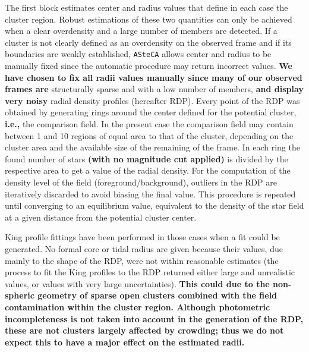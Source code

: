 \documentclass[referee]{aa}
\begin{document}
The first block estimates center and radius values that define in each case the
cluster region. Robust estimations of these two quantities can only be achieved
when a clear overdensity and a large number of members are detected.
If a cluster is not clearly defined as an overdensity on the observed frame and
if its boundaries are weakly established, \texttt{ASteCA} allows center and
radius to be manually fixed since the automatic procedure may return incorrect
values. \textbf{We have chosen to fix all radii values manually since many of
our observed frames are} structurally sparse and with a low number of members,
\textbf{and display very noisy} radial density profiles (hereafter RDP).
%
Every point of the RDP was obtained by generating rings around the
center defined for the potential cluster, \textbf{i.e.,} the comparison field.
In the present case the comparison field may contain between 1 and 10 regions
of equal area to that of the cluster, depending on the cluster area and the
available size of the remaining of the frame. In each ring the found number of
stars \textbf{(with no magnitude cut applied)} is divided by the respective
area to get a value of the radial density.
For the computation of the density level of the field (foreground/background),
outliers in the RDP are iteratively discarded to avoid biasing the final value.
This procedure is repeated until converging to an equilibrium value, equivalent
to the density of the star field at a given distance from the potential
cluster center.

King profile fittings have been performed in those cases when a
fit could be generated. No formal core or tidal radius are given because their
values, due mainly to the shape of the RDP, were not within reasonable
estimates (the process to fit the King profiles to the RDP returned either
large and unrealistic values, or values with very large uncertainties).
\textbf{This could due to the non-spheric geometry of sparse open clusters
combined with the field contamination within the cluster region. Although
photometric incompleteness is not taken into account in the generation of the
RDP, these are not clusters largely affected by crowding; thus we do not
expect this to have a major effect on the estimated radii.}\\
\end{document}
